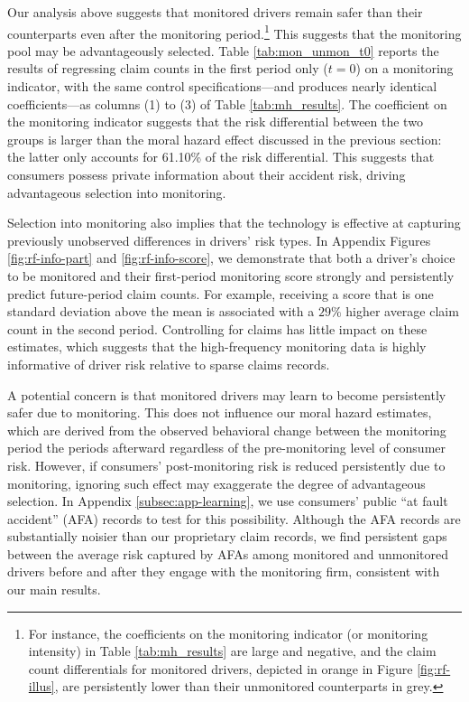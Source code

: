 Our analysis above suggests that monitored drivers remain safer than their counterparts even after the monitoring period.\footnote{For instance, the coefficients on the monitoring indicator (or monitoring intensity) in Table \ref{tab:mh_results} are large and negative, and the claim count differentials for monitored drivers, depicted in orange in Figure \ref{fig:rf-illus}, are persistently lower than their unmonitored counterparts in grey.} This suggests that the monitoring pool may be advantageously selected.  Table \ref{tab:mon_unmon_t0} reports the results of regressing claim counts in the first period only ($t=0$) on a monitoring indicator, with the same control specifications---and produces nearly identical coefficients---as columns (1) to (3) of Table \ref{tab:mh_results}. The coefficient on the monitoring indicator suggests that the risk differential between the two groups is larger than the moral hazard effect discussed in the previous section: the latter only accounts for 61.10\% of the risk differential. This suggests that consumers possess private information about their accident risk, driving advantageous selection into monitoring.

Selection into monitoring also implies that the technology is effective at capturing previously unobserved differences in drivers' risk types. In Appendix Figures \ref{fig:rf-info-part} and \ref{fig:rf-info-score}, we demonstrate that both a driver's choice to be monitored and their first-period monitoring score strongly and persistently predict future-period claim counts. For example, receiving a score that is one standard deviation above the mean is associated with a $29\%$ higher average claim count in the second period. Controlling for claims has little impact on these estimates, which suggests that the high-frequency monitoring data is highly informative of driver risk relative to sparse claims records.

A potential concern is that monitored drivers may learn to become persistently safer due to monitoring. This does not influence our moral hazard estimates, which are derived from the observed behavioral change between the monitoring period the periods afterward regardless of the pre-monitoring level of consumer risk. However, if consumers' post-monitoring risk is reduced persistently due to monitoring, ignoring such effect may exaggerate the degree of advantageous selection. In Appendix \ref{subsec:app-learning}, we use consumers' public ``at fault accident'' (AFA) records to test for this possibility. Although the AFA records are substantially noisier than our proprietary claim records, we find persistent gaps between the average risk captured by AFAs among monitored and unmonitored drivers before and after they engage with the monitoring firm, consistent with our main results.


